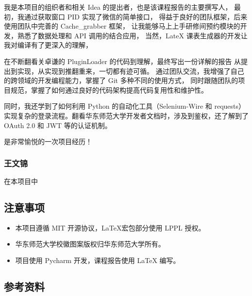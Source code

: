 \documentclass[14pt,a4paper,UTF8,twoside]{article}
\renewcommand{\texttt}[1]{{\color{blue}\ttfamily#1}}
\begin{document}
\begin{Thought}
我是本项目的组织者和相关 Idea 的提出者，也是该课程报告的主要撰写人，
最初，我通过获取窗口 \texttt{PID} 实现了微信的简单接口，
得益于良好的团队框架，后来使用团队中完善的 \texttt{Cache\_grabber} 框架，
让我能够马上上手研修间预约模块的开发，熟悉了数据处理和 API 调用的结合应用，
当然，LateX 课表生成器的开发让我对编译有了更深入的理解，

\vspace{0.3cm}

在不断翻看关卓谦的 \texttt{PluginLoader} 的代码到理解，最终写出一份详解的报告
从提出到实现，从实现到推翻重来，一切都有迹可循。
通过团队交流，我增强了自己的跨领域的开发编程能力，掌握了 Git 多种不同的使用方式，
同时跟随团队的项目规范，掌握了如何通过良好的代码架构提高代码复用性和维护性。

\vspace{0.3cm}

同时，我还学到了如何利用 Python 的自动化工具（Selenium-Wire 和 requests）
实现复杂的登录流程。翻看华东师范大学开发者文档时，涉及到鉴权，还了解到了 OAuth 2.0 和 JWT 等的认证机制。

\vspace{0.3cm}

是非常愉悦的一次项目经历！
\end{Thought}

\subsubsection*{王文锦}

\begin{Thought}
在本项目中
\end{Thought}

\subsection{注意事项}

\begin{itemize}
    \item 本项目遵循 MIT 开源协议，\LaTeX 宏包部分使用 LPPL 授权。
    \item 华东师范大学校徽图案版权归华东师范大学所有。
    \item 项目使用 Pycharm 开发，课程报告使用 LaTeX 编写。 
\end{itemize}

\subsection{参考资料}
\end{document}
